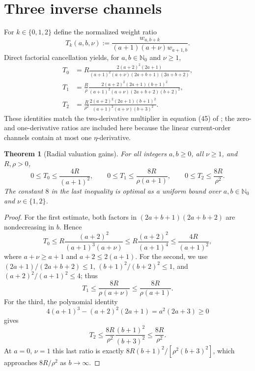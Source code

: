 \documentclass[11pt]{article}
\newtheorem{theorem}{Theorem}
\begin{document}
\section{Three inverse channels}
For $k\in\{0,1,2\}$ define the normalized weight ratio
\begin{equation}\label{eq:ratio_def}
 T_k(a,b,\nu):=\frac{w_{a,b+k}}{(a+1)(a+\nu)w_{a+1,b}}.
\end{equation}
Direct factorial cancellation yields, for $a,b\in\mathbb N_0$ and $\nu\ge1$,
\begin{align}
 T_0&=R\frac{2(a+2)^2(2a+1)}{(a+1)^2(a+\nu)(2a+b+1)(2a+b+2)},\label{eq:t0}\\
 T_1&=\frac R\rho\frac{2(a+2)^2(2a+1)(b+1)^2}{(a+1)^2(a+\nu)(2a+b+2)(b+2)^2},\label{eq:t1}\\
 T_2&=\frac R{\rho^2}\frac{2(a+2)^2(2a+1)(b+1)^2}{(a+1)^2(a+\nu)(b+3)^2}.\label{eq:t2}
\end{align}
These identities match the two-derivative multiplier in equation (45) of \cite{newton2026}; the zero- and one-derivative ratios are included here because the linear current-order channels contain at most one $\eta$-derivative.

\begin{theorem}[Radial valuation gains]\label{thm:ratios}
For all integers $a,b\ge0$, all $\nu\ge1$, and $R,\rho>0$,
\begin{equation}\label{eq:bounds}
 0\le T_0\le \frac{4R}{(a+1)^2},\qquad
 0\le T_1\le \frac{8R}{\rho(a+1)},\qquad
 0\le T_2\le \frac{8R}{\rho^2}.
\end{equation}
The constant $8$ in the last inequality is optimal as a uniform bound over $a,b\in\mathbb N_0$ and $\nu\in\{1,2\}$.
\end{theorem}
\begin{proof}
For the first estimate, both factors in $(2a+b+1)(2a+b+2)$ are nondecreasing in $b$. Hence
\[
 T_0\le R\frac{(a+2)^2}{(a+1)^3(a+\nu)}
 \le R\frac{(a+2)^2}{(a+1)^4}\le\frac{4R}{(a+1)^2},
\]
where $a+\nu\ge a+1$ and $a+2\le2(a+1)$. For the second, we use $(2a+1)/(2a+b+2)\le1$, $(b+1)^2/(b+2)^2\le1$, and $(a+2)^2/(a+1)^2\le4$; thus
\[
 T_1\le\frac{8R}{\rho(a+\nu)}\le\frac{8R}{\rho(a+1)}.
\]
For the third, the polynomial identity
\[
 4(a+1)^3-(a+2)^2(2a+1)=a^2(2a+3)\ge0
\]
gives
\[
 T_2\le\frac{8R}{\rho^2}\frac{(b+1)^2}{(b+3)^2}
 \le\frac{8R}{\rho^2}.
\]
At $a=0$, $\nu=1$ this last ratio is exactly $8R(b+1)^2/[\rho^2(b+3)^2]$, which approaches $8R/\rho^2$ as $b\to\infty$.
\end{proof}
\end{document}
